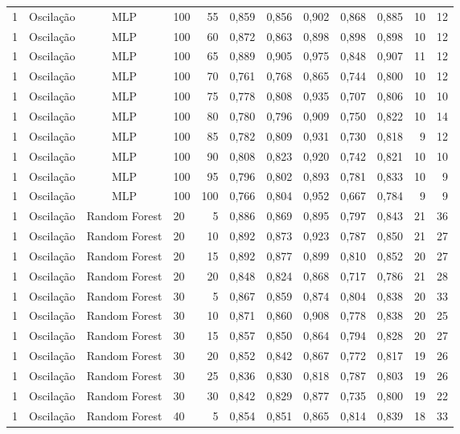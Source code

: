\begin{longtable}{ccclrrrrrrrr}
1 & Oscilação & MLP & 100 & 55 & 0,859 & 0,856 & 0,902 & 0,868 & 0,885 & 10 & 12 \\
1 & Oscilação & MLP & 100 & 60 & 0,872 & 0,863 & 0,898 & 0,898 & 0,898 & 10 & 12 \\
1 & Oscilação & MLP & 100 & 65 & 0,889 & 0,905 & 0,975 & 0,848 & 0,907 & 11 & 12 \\
1 & Oscilação & MLP & 100 & 70 & 0,761 & 0,768 & 0,865 & 0,744 & 0,800 & 10 & 12 \\
1 & Oscilação & MLP & 100 & 75 & 0,778 & 0,808 & 0,935 & 0,707 & 0,806 & 10 & 10 \\
1 & Oscilação & MLP & 100 & 80 & 0,780 & 0,796 & 0,909 & 0,750 & 0,822 & 10 & 14 \\
1 & Oscilação & MLP & 100 & 85 & 0,782 & 0,809 & 0,931 & 0,730 & 0,818 & 9 & 12 \\
1 & Oscilação & MLP & 100 & 90 & 0,808 & 0,823 & 0,920 & 0,742 & 0,821 & 10 & 10 \\
1 & Oscilação & MLP & 100 & 95 & 0,796 & 0,802 & 0,893 & 0,781 & 0,833 & 10 & 9 \\
1 & Oscilação & MLP & 100 & 100 & 0,766 & 0,804 & 0,952 & 0,667 & 0,784 & 9 & 9 \\
1 & Oscilação & Random Forest & 20 & 5 & 0,886 & 0,869 & 0,895 & 0,797 & 0,843 & 21 & 36 \\
1 & Oscilação & Random Forest & 20 & 10 & 0,892 & 0,873 & 0,923 & 0,787 & 0,850 & 21 & 27 \\
1 & Oscilação & Random Forest & 20 & 15 & 0,892 & 0,877 & 0,899 & 0,810 & 0,852 & 20 & 27 \\
1 & Oscilação & Random Forest & 20 & 20 & 0,848 & 0,824 & 0,868 & 0,717 & 0,786 & 21 & 28 \\
1 & Oscilação & Random Forest & 30 & 5 & 0,867 & 0,859 & 0,874 & 0,804 & 0,838 & 20 & 33 \\
1 & Oscilação & Random Forest & 30 & 10 & 0,871 & 0,860 & 0,908 & 0,778 & 0,838 & 20 & 25 \\
1 & Oscilação & Random Forest & 30 & 15 & 0,857 & 0,850 & 0,864 & 0,794 & 0,828 & 20 & 27 \\
1 & Oscilação & Random Forest & 30 & 20 & 0,852 & 0,842 & 0,867 & 0,772 & 0,817 & 19 & 26 \\
1 & Oscilação & Random Forest & 30 & 25 & 0,836 & 0,830 & 0,818 & 0,787 & 0,803 & 19 & 26 \\
1 & Oscilação & Random Forest & 30 & 30 & 0,842 & 0,829 & 0,877 & 0,735 & 0,800 & 19 & 22 \\
1 & Oscilação & Random Forest & 40 & 5 & 0,854 & 0,851 & 0,865 & 0,814 & 0,839 & 18 & 33 \\

\end{longtable}
